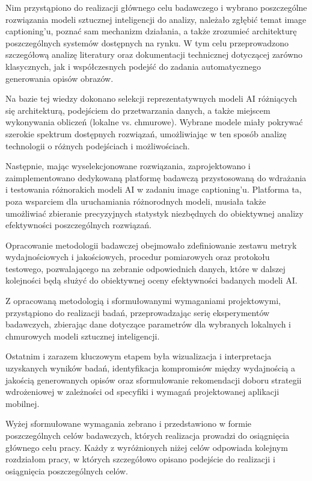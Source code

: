 Nim przystąpiono do realizacji głównego celu badawczego i wybrano poszczególne rozwiązania modeli sztucznej inteligencji
do analizy, należało zgłębić temat image captioning'u, poznać sam mechanizm działania, a także zrozumieć architekturę poszczególnych systemów 
dostępnych na rynku. W tym celu przeprowadzono szczegółową analizę literatury oraz dokumentacji technicznej
dotyczącej zarówno klasycznych, jak i współczesnych podejść do zadania automatycznego generowania opisów obrazów.

Na bazie tej wiedzy dokonano selekcji reprezentatywnych modeli AI różniących się architekturą, podejściem do przetwarzania danych, a także miejscem wykonywania obliczeń (lokalne vs. chmurowe). 
Wybrane modele miały pokrywać szerokie spektrum dostępnych rozwiązań,
umożliwiając w ten sposób analizę technologii o różnych podejściach i możliwościach.

Następnie, mając wyselekcjonowane rozwiązania, zaprojektowano i zaimplementowano dedykowaną platformę badawczą przystosowaną do wdrażania
i testowania różnorakich modeli AI w zadaniu image captioning'u. Platforma ta, poza wsparciem dla uruchamiania różnorodnych modeli, musiała także umożliwiać 
zbieranie precyzyjnych statystyk niezbędnych do obiektywnej analizy efektywności poszczególnych rozwiązań.

Opracowanie metodologii badawczej obejmowało zdefiniowanie zestawu metryk wydajnościowych i jakościowych, 
procedur pomiarowych oraz protokołu testowego, pozwalającego na zebranie odpowiednich danych, które w dalszej kolejności 
będą służyć do obiektywnej oceny efektywności badanych modeli AI.

Z opracowaną metodologią i sformułowanymi wymaganiami projektowymi, przystąpiono do realizacji badań, przeprowadzając serię eksperymentów
badawczych, zbierając dane dotyczące parametrów dla wybranych lokalnych i chmurowych modeli sztucznej inteligencji.

Ostatnim i zarazem kluczowym etapem była wizualizacja i interpretacja uzyskanych wyników badań, identyfikacja kompromisów między wydajnością a jakością
generowanych opisów oraz sformułowanie rekomendacji doboru strategii wdrożeniowej w zależności od specyfiki i wymagań projektowanej aplikacji mobilnej.

Wyżej sformułowane wymagania zebrano i przedstawiono w formie poszczególnych celów badawczych, których realizacja prowadzi do osiągnięcia głównego celu pracy.
Każdy z wyróżnionych niżej celów odpowiada kolejnym rozdziałom pracy, w których szczegółowo opisano podejście do realizacji i osiągnięcia poszczególnych celów.

